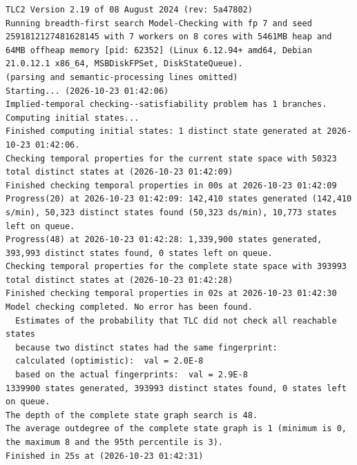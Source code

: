 \documentclass[11pt,a4paper]{article}
\begin{document}
\begin{lstlisting}[float, caption={SaeProvision\_chain.cfg result}, captionpos=t, label={lst:tlc-saeprovision-chain}]
TLC2 Version 2.19 of 08 August 2024 (rev: 5a47802)
Running breadth-first search Model-Checking with fp 7 and seed 2591812127481628145 with 7 workers on 8 cores with 5461MB heap and 64MB offheap memory [pid: 62352] (Linux 6.12.94+ amd64, Debian 21.0.12.1 x86_64, MSBDiskFPSet, DiskStateQueue).
(parsing and semantic-processing lines omitted)
Starting... (2026-10-23 01:42:06)
Implied-temporal checking--satisfiability problem has 1 branches.
Computing initial states...
Finished computing initial states: 1 distinct state generated at 2026-10-23 01:42:06.
Checking temporal properties for the current state space with 50323 total distinct states at (2026-10-23 01:42:09)
Finished checking temporal properties in 00s at 2026-10-23 01:42:09
Progress(20) at 2026-10-23 01:42:09: 142,410 states generated (142,410 s/min), 50,323 distinct states found (50,323 ds/min), 10,773 states left on queue.
Progress(48) at 2026-10-23 01:42:28: 1,339,900 states generated, 393,993 distinct states found, 0 states left on queue.
Checking temporal properties for the complete state space with 393993 total distinct states at (2026-10-23 01:42:28)
Finished checking temporal properties in 02s at 2026-10-23 01:42:30
Model checking completed. No error has been found.
  Estimates of the probability that TLC did not check all reachable states
  because two distinct states had the same fingerprint:
  calculated (optimistic):  val = 2.0E-8
  based on the actual fingerprints:  val = 2.9E-8
1339900 states generated, 393993 distinct states found, 0 states left on queue.
The depth of the complete state graph search is 48.
The average outdegree of the complete state graph is 1 (minimum is 0, the maximum 8 and the 95th percentile is 3).
Finished in 25s at (2026-10-23 01:42:31)
\end{lstlisting}
\bigskip
\end{document}
